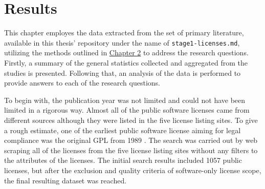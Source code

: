 \chapter{Results\label{results}}
This chapter employes the data extracted from the set of primary literature, available in this thesis' repository \citep{mscthesis} under the name of \texttt{stage1-licenses.md}, utilizing the methods outlined in \hyperref[methods]{Chapter 2} to address the research questions. Firstly, a summary of the general statistics collected and aggregated from the studies is presented. Following that, an analysis of the data is performed to provide answers to each of the research questions.

To begin with, the publication year was not limited and could not have been limited in a rigorous way. Almost all of the public software licenses came from different sources although they were listed in the five license listing sites. To give a rough estimate, one of the earliest public software license aiming for legal compliance was the original GPL from 1989 \citep{license-history}. The search was carried out by web scraping all of the licenses from the five license listing sites without any filters to the attributes of the licenses. The initial search results included 1057 public licenses, but after the exclusion and quality criteria of software-only license scope, the final resulting dataset was reached.

